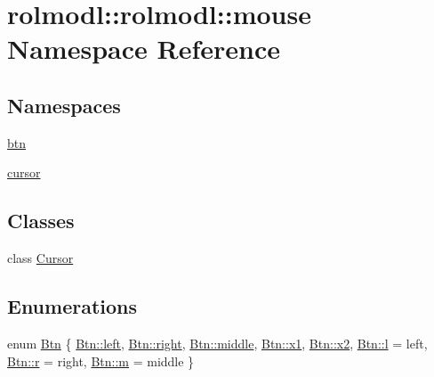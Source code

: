 \hypertarget{namespacerolmodl_1_1rolmodl_1_1mouse}{}\section{rolmodl\+::rolmodl\+::mouse Namespace Reference}
\label{namespacerolmodl_1_1rolmodl_1_1mouse}
\subsection*{Namespaces}
\begin{DoxyCompactItemize}
\item 
 \mbox{\hyperlink{namespacerolmodl_1_1rolmodl_1_1mouse_1_1btn}{btn}}
\item 
 \mbox{\hyperlink{namespacerolmodl_1_1rolmodl_1_1mouse_1_1cursor}{cursor}}
\end{DoxyCompactItemize}
\subsection*{Classes}
\begin{DoxyCompactItemize}
\item 
class \mbox{\hyperlink{classrolmodl_1_1rolmodl_1_1mouse_1_1_cursor}{Cursor}}
\end{DoxyCompactItemize}
\subsection*{Enumerations}
\begin{DoxyCompactItemize}
\item 
enum \mbox{\hyperlink{namespacerolmodl_1_1rolmodl_1_1mouse_a5ed523191c7ec81f6e69f02b9a616ebf}{Btn}} \{ \newline
\mbox{\hyperlink{namespacerolmodl_1_1rolmodl_1_1mouse_a5ed523191c7ec81f6e69f02b9a616ebfa811882fecd5c7618d7099ebbd39ea254}{Btn\+::left}}, 
\mbox{\hyperlink{namespacerolmodl_1_1rolmodl_1_1mouse_a5ed523191c7ec81f6e69f02b9a616ebfa7c4f29407893c334a6cb7a87bf045c0d}{Btn\+::right}}, 
\mbox{\hyperlink{namespacerolmodl_1_1rolmodl_1_1mouse_a5ed523191c7ec81f6e69f02b9a616ebfa4a548addbfb239bbd12f5afe11a4b6dc}{Btn\+::middle}}, 
\mbox{\hyperlink{namespacerolmodl_1_1rolmodl_1_1mouse_a5ed523191c7ec81f6e69f02b9a616ebfa6dbf9ac2da09ee1d3debf5a51873ec6d}{Btn\+::x1}}, 
\newline
\mbox{\hyperlink{namespacerolmodl_1_1rolmodl_1_1mouse_a5ed523191c7ec81f6e69f02b9a616ebfa8e683187a00e5d462a4aeee69e9d3d9c}{Btn\+::x2}}, 
\mbox{\hyperlink{namespacerolmodl_1_1rolmodl_1_1mouse_a5ed523191c7ec81f6e69f02b9a616ebfa2db95e8e1a9267b7a1188556b2013b33}{Btn\+::l}} = left, 
\mbox{\hyperlink{namespacerolmodl_1_1rolmodl_1_1mouse_a5ed523191c7ec81f6e69f02b9a616ebfa4b43b0aee35624cd95b910189b3dc231}{Btn\+::r}} = right, 
\mbox{\hyperlink{namespacerolmodl_1_1rolmodl_1_1mouse_a5ed523191c7ec81f6e69f02b9a616ebfa6f8f57715090da2632453988d9a1501b}{Btn\+::m}} = middle
 \}
\end{DoxyCompactItemize}


